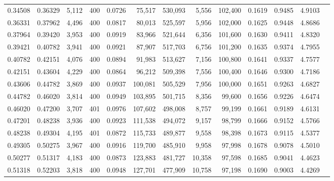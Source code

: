 \begin{tabular}{rrrrrrrrrrrrr}
0.34508 & 0.36329 & 5,112 & 400 &                                     0.0726 &  75,517 & 530,093 &   5,556 & 102,400 & 0.1619 & 0.9485 & 4.9103 \\
0.36331 & 0.37962 & 4,496 & 400 &                                     0.0817 &  80,013 & 525,597 &   5,956 & 102,000 & 0.1625 & 0.9448 & 4.8686 \\
0.37964 & 0.39420 & 3,953 & 400 &                                     0.0919 &  83,966 & 521,644 &   6,356 & 101,600 & 0.1630 & 0.9411 & 4.8320 \\
0.39421 & 0.40782 & 3,941 & 400 &                                     0.0921 &  87,907 & 517,703 &   6,756 & 101,200 & 0.1635 & 0.9374 & 4.7955 \\
0.40782 & 0.42151 & 4,076 & 400 &                                     0.0894 &  91,983 & 513,627 &   7,156 & 100,800 & 0.1641 & 0.9337 & 4.7577 \\
0.42151 & 0.43604 & 4,229 & 400 &                                     0.0864 &  96,212 & 509,398 &   7,556 & 100,400 & 0.1646 & 0.9300 & 4.7186 \\
0.43606 & 0.44782 & 3,869 & 400 &                                     0.0937 & 100,081 & 505,529 &   7,956 & 100,000 & 0.1651 & 0.9263 & 4.6827 \\
0.44782 & 0.46020 & 3,814 & 400 &                                     0.0949 & 103,895 & 501,715 &   8,356 &  99,600 & 0.1656 & 0.9226 & 4.6474 \\
0.46020 & 0.47200 & 3,707 & 401 &                                     0.0976 & 107,602 & 498,008 &   8,757 &  99,199 & 0.1661 & 0.9189 & 4.6131 \\
0.47201 & 0.48238 & 3,936 & 400 &                                     0.0923 & 111,538 & 494,072 &   9,157 &  98,799 & 0.1666 & 0.9152 & 4.5766 \\
0.48238 & 0.49304 & 4,195 & 401 &                                     0.0872 & 115,733 & 489,877 &   9,558 &  98,398 & 0.1673 & 0.9115 & 4.5377 \\
0.49305 & 0.50275 & 3,967 & 400 &                                     0.0916 & 119,700 & 485,910 &   9,958 &  97,998 & 0.1678 & 0.9078 & 4.5010 \\
0.50277 & 0.51317 & 4,183 & 400 &                                     0.0873 & 123,883 & 481,727 &  10,358 &  97,598 & 0.1685 & 0.9041 & 4.4623 \\
0.51318 & 0.52203 & 3,818 & 400 &                                     0.0948 & 127,701 & 477,909 &  10,758 &  97,198 & 0.1690 & 0.9003 & 4.4269 \\

\end{tabular}
